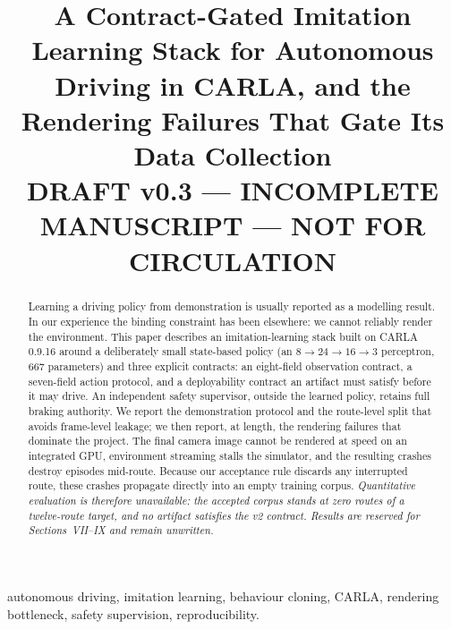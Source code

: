 \documentclass[conference]{IEEEtran}
\begin{document}
\title{A Contract-Gated Imitation Learning Stack for Autonomous Driving
in CARLA, and the Rendering Failures That Gate Its Data Collection\\[3pt]
{\normalsize\color{red!65!black}\bfseries DRAFT v0.3 --- INCOMPLETE MANUSCRIPT --- NOT FOR CIRCULATION}}

\author{
}

\maketitle

\begin{abstract}
Learning a driving policy from demonstration is usually reported as a
modelling result. In our experience the binding constraint has been
elsewhere: we cannot reliably render the environment. This paper
describes an imitation-learning stack built on CARLA 0.9.16 around a
deliberately small state-based policy (an
$8\rightarrow24\rightarrow16\rightarrow3$ perceptron, 667 parameters)
and three explicit contracts: an eight-field observation contract, a
seven-field action protocol, and a deployability contract an artifact
must satisfy before it may drive. An independent safety supervisor,
outside the learned policy, retains full braking authority. We report
the demonstration protocol and the route-level split that avoids
frame-level leakage; we then report, at length, the rendering
failures that dominate the project. The final camera image
cannot be rendered at speed on an integrated GPU, environment streaming
stalls the simulator, and the resulting crashes destroy episodes
mid-route. Because our acceptance rule discards any interrupted route,
these crashes propagate directly into an empty training corpus.
\textit{Quantitative evaluation is therefore unavailable: the accepted
corpus stands at zero routes of a twelve-route target, and no artifact
satisfies the v2 contract. Results are reserved for Sections~VII--IX and
remain unwritten.}
\end{abstract}

\begin{IEEEkeywords}
autonomous driving, imitation learning, behaviour cloning, CARLA,
rendering bottleneck, safety supervision, reproducibility.
\end{IEEEkeywords}
\end{document}
